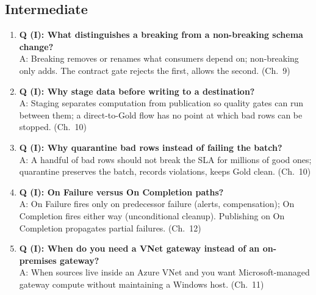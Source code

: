 \subsection*{Intermediate}
\begin{enumerate}
    \item \textbf{Q (I): What distinguishes a breaking from a non-breaking schema change?}\\
    A: Breaking removes or renames what consumers depend on; non-breaking only adds. The
    contract gate rejects the first, allows the second. (Ch.~9)
    \item \textbf{Q (I): Why stage data before writing to a destination?}\\
    A: Staging separates computation from publication so quality gates can run between them; a
    direct-to-Gold flow has no point at which bad rows can be stopped. (Ch.~10)
    \item \textbf{Q (I): Why quarantine bad rows instead of failing the batch?}\\
    A: A handful of bad rows should not break the SLA for millions of good ones; quarantine
    preserves the batch, records violations, keeps Gold clean. (Ch.~10)
    \item \textbf{Q (I): On Failure versus On Completion paths?}\\
    A: On Failure fires only on predecessor failure (alerts, compensation); On Completion fires
    either way (unconditional cleanup). Publishing on On Completion propagates partial
    failures. (Ch.~12)
    \item \textbf{Q (I): When do you need a VNet gateway instead of an on-premises gateway?}\\
    A: When sources live inside an Azure VNet and you want Microsoft-managed gateway compute
    without maintaining a Windows host. (Ch.~11)
\end{enumerate}

